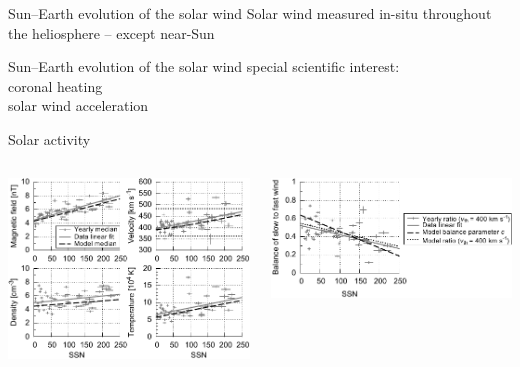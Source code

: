\begin{frame}[plain,c]{Sun--Earth evolution of the solar wind}{}
	Solar wind measured in-situ throughout the heliosphere -- except near-Sun
\end{frame}
\begin{frame}[plain,c]{Sun--Earth evolution of the solar wind}{}
	special scientific interest:\\
	coronal heating\\
	solar wind acceleration
\end{frame}
\begin{frame}[plain,c]{Solar activity}{}
	\begin{columns}[c]
		
		\includegraphics[width=\textwidth]{../figures_paper/OMNI_yearly_BVNTvsSSN_a.pdf}


		\includegraphics[width=\textwidth]{../figures_paper/Vdbl_SSN_ratio_f_plot.pdf}

	\end{columns}
\end{frame}

